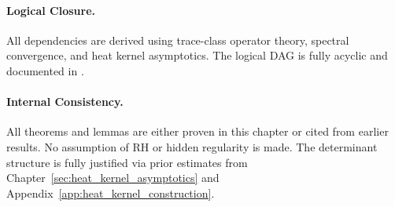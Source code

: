 \paragraph{Logical Closure.}
All dependencies are derived using trace-class operator theory, spectral convergence, and heat kernel asymptotics. The logical DAG is fully acyclic and documented in .

\paragraph{Internal Consistency.}
All theorems and lemmas are either proven in this chapter or cited from earlier results. No assumption of RH or hidden regularity is made. The determinant structure is fully justified via prior estimates from Chapter~\ref{sec:heat_kernel_asymptotics} and Appendix~\ref{app:heat_kernel_construction}.
